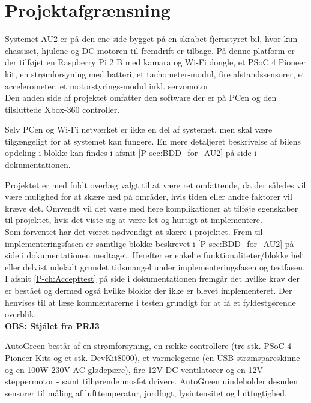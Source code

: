 \chapter{Projektafgrænsning} \label{ch:Projektafgraensning}

Systemet AU2 er på den ene side bygget på en skrabet fjernstyret bil, hvor kun chassiset, hjulene og DC-motoren til fremdrift er tilbage. På denne platform er der tilføjet en Raspberry Pi 2 B med kamara og Wi-Fi dongle, et PSoC 4 Pioneer kit, en strømforsyning med batteri, et tachometer-modul, fire afstandssensorer, et accelerometer, et motorstyrings-modul inkl. servomotor. \\
Den anden side af projektet omfatter den software der er på PCen og den tilsluttede Xbox-360 controller. 

Selv PCen og Wi-Fi netværket er ikke en del af systemet, men skal være tilgængeligt for at systemet kan fungere. 
En mere detaljeret beskrivelse af bilens opdeling i blokke kan findes i afsnit \ref{P-sec:BDD_for_AU2}  på side \pageref{P-sec:BDD_for_AU2} i dokumentationen. \newline


Projektet er med fuldt overlæg valgt til at være ret omfattende, da der således vil være mulighed for at skære ned på områder, hvis tiden eller andre faktorer vil kræve det. Omvendt vil det være med flere komplikationer at tilføje egenskaber til projektet, hvis det viste sig at være let og hurtigt at implementere.\\
Som forventet har det været nødvendigt at skære i projektet. Frem til implementeringsfasen er samtlige blokke beskrevet i \ref{P-sec:BDD_for_AU2}  på side \pageref{P-sec:BDD_for_AU2} i dokumentationen medtaget. Herefter er enkelte funktionaliteter/blokke helt eller delvist udeladt grundet tidsmangel under implementeringsfasen og testfasen. I afsnit \ref{P-ch:Accepttest}  på side \pageref{P-ch:Accepttest} i dokumentationen fremgår det hvilke krav der er bestået og dermed også hvilke blokke der ikke er blevet implementeret. Der henvises til at læse kommentarerne i testen grundigt for at få et fyldestgørende overblik.\\

\textbf{OBS: Stjålet fra PRJ3}

AutoGreen består af en strømforsyning, en række controllere (tre stk. PSoC 4 Pioneer Kits og et stk. DevKit8000), et varmelegeme (en USB strømspareskinne og en 100W 230V AC glødepære), fire 12V DC ventilatorer og en 12V steppermotor - samt tilhørende mosfet drivere. 
AutoGreen uindeholder desuden sensorer til måling af lufttemperatur, jordfugt, lysintensitet og luftfugtighed.

